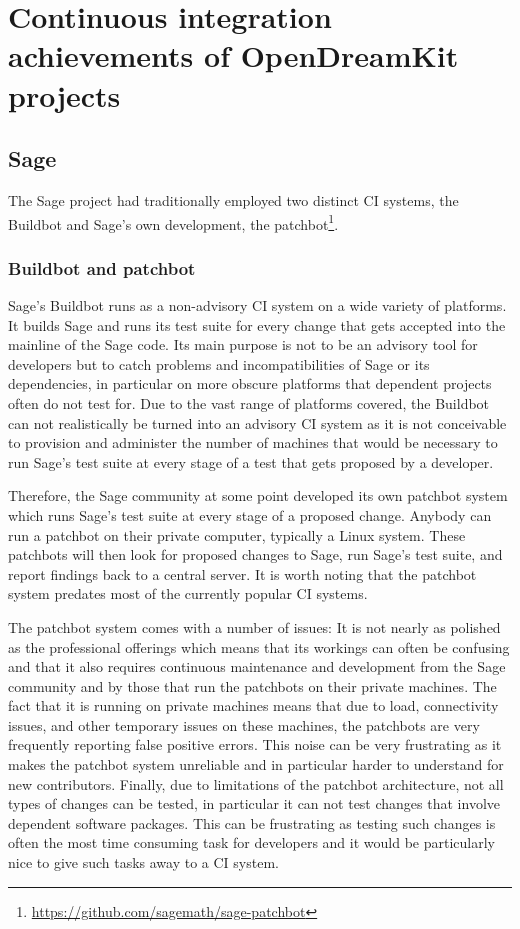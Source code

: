 \documentclass{deliverablereport}
\begin{document}
\hypertarget{project-reports}{%
\section{Continuous integration achievements of OpenDreamKit projects}\label{project-reports}}

\subsection{Sage}

The Sage project had traditionally employed two distinct CI systems, the
Buildbot and Sage's own development, the
patchbot\footnote{\url{https://github.com/sagemath/sage-patchbot}}.

\subsubsection{Buildbot and patchbot}
Sage's Buildbot runs as a non-advisory CI system on a wide variety of
platforms. It builds Sage and runs its test suite for every change that gets
accepted into the mainline of the Sage code. Its main purpose is not to be an
advisory tool for developers but to catch problems and incompatibilities of
Sage or its dependencies, in particular on more obscure platforms that
dependent projects often do not test for. Due to the vast range of platforms
covered, the Buildbot can not realistically be turned into an advisory CI
system as it is not conceivable to provision and administer the number of
machines that would be necessary to run Sage's test suite at every stage of a
test that gets proposed by a developer.

Therefore, the Sage community at some point developed its own patchbot system
which runs Sage's test suite at every stage of a proposed change. Anybody can
run a patchbot on their private computer, typically a Linux system. These
patchbots will then look for proposed changes to Sage, run Sage's test suite,
and report findings back to a central server. It is worth noting that the
patchbot system predates most of the currently popular CI systems.

The patchbot system comes with a number of issues: It is not nearly as polished
as the professional offerings which means that its workings can often be
confusing and that it also requires continuous maintenance and development from
the Sage community and by those that run the patchbots on their private
machines. The fact that it is running on private machines means that due to
load, connectivity issues, and other temporary issues on these machines, the
patchbots are very frequently reporting false positive errors.
This noise can be very frustrating as it makes the patchbot system unreliable
and in particular harder to understand for new contributors. Finally, due to
limitations of the patchbot architecture, not all types of changes can be
tested, in particular it can not test changes that involve dependent software
packages. This can be frustrating as testing such changes is often the most
time consuming task for developers and it would be particularly nice to give
such tasks away to a CI system.
\end{document}
